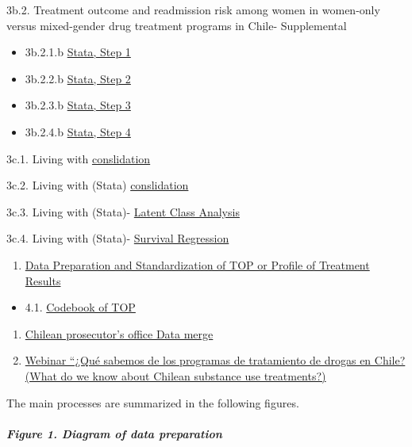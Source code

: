 \documentclass[
]{article}
\providecommand{\tightlist}{%
  \setlength{\itemsep}{0pt}\setlength{\parskip}{0pt}}
\begin{document}
3b.2. Treatment outcome and readmission risk among women in women-only
versus mixed-gender drug treatment programs in Chile- Supplemental

\begin{itemize}
\item
  3b.2.1.b \href{Proyecto_carla1_stata_JUN_21}{Stata, Step 1}
\item
  3b.2.2.b \href{Proyecto_carla2_stata_JUN_21}{Stata, Step 2}
\item
  3b.2.3.b \href{Proyecto_carla3_stata_JUN_21}{Stata, Step 3}
\item
  3b.2.4.b \href{Proyecto_carla4_stata_JUN_21}{Stata, Step 4}
\end{itemize}

3c.1. Living with \href{analisis_joel2}{conslidation}

3c.2. Living with (Stata)
\href{analisis_joel_oct_2021_stata1}{conslidation}

3c.3. Living with (Stata)- \href{analisis_joel_oct_2021_stata2}{Latent
Class Analysis}

3c.4. Living with (Stata)- \href{analisis_joel_oct_2021_stata3}{Survival
Regression}

\begin{enumerate}
\def\labelenumi{\arabic{enumi}.}
\setcounter{enumi}{3}
\tightlist
\item
  \href{Data_prep_TOP}{Data Preparation and Standardization of TOP or
  Profile of Treatment Results}
\end{enumerate}

\begin{itemize}
\tightlist
\item
  4.1. \href{codebook_TOP}{Codebook of TOP}
\end{itemize}

\begin{enumerate}
\def\labelenumi{\arabic{enumi}.}
\setcounter{enumi}{4}
\item
  \href{Fiscalia_merge}{Chilean prosecutor's office Data merge}
\item
  \href{https://youtu.be/xuROIbzEw5I}{Webinar ``¿Qué sabemos de los
  programas de tratamiento de drogas en Chile? (What do we know about
  Chilean substance use treatments?)}
\end{enumerate}

The main processes are summarized in the following figures.

\hypertarget{figure-1.-diagram-of-data-preparation}{%
\subparagraph{Figure 1. Diagram of data
preparation}\label{figure-1.-diagram-of-data-preparation}}
\end{document}
